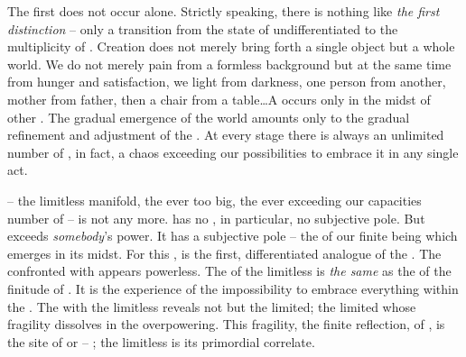 The first  does not occur alone. Strictly speaking, there is
nothing like {\em the first distinction} -- only a transition from the state of
undifferentiated  to the multiplicity of . Creation
does not merely bring forth a single object but a whole world. We do not merely
 pain from a formless background but at the same time from
hunger and satisfaction, we  light from darkness, one person
from another, mother from father, then a chair from a table\dots A
 occurs only in the midst of other .  The
gradual emergence of the world amounts only to the gradual refinement and
adjustment of the .  At every stage there is always an
unlimited number of , in fact, a chaos exceeding our
possibilities to embrace it in any single act.

 -- the limitless manifold, the ever too big, the ever exceeding
our capacities number of  -- is not  any more.
 has no , in particular, no subjective pole.
But  exceeds {\em somebody}'s power.  It has a subjective pole -- the
 of our finite being which emerges in its midst. For this
,  is the first, differentiated analogue of the
.
The  confronted with  appears powerless.  The
 of the limitless  is {\em the same} as the
 of the finitude of . It is the experience of
the impossibility to embrace everything within the \hoa.  The 
with the limitless reveals not  but the limited; the limited
whose fragility dissolves in the overpowering.  This fragility, the finite
reflection,  of , is the site of  or --
; the limitless is its primordial correlate.


